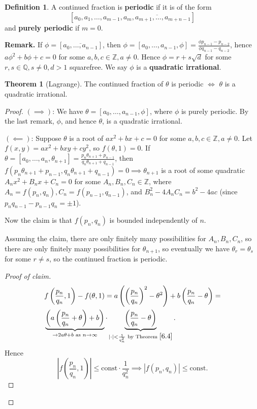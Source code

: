 \documentclass{article}
\theoremstyle{definition}
\newtheorem{theorem}{Theorem}[section]
\newtheorem{defn}{Definition}[section]
\begin{document}
\begin{defn}
    A continued fraction is \textbf{periodic} if it is of the form \[
    [a_0,a_1,\ldots,a_{m-1},\overline{a_m,a_{m+1},\ldots,a_{m+n-1}}]
    \]
    and \textbf{purely periodic} if $m=0$.
\end{defn}
\textbf{Remark.} If $\phi=[\overline{a_0,\ldots,a_{n-1}}]$, then $\phi=[a_0,\ldots,a_{n-1},\phi] = \frac{\phi p_{n-1}-p_{n-2}}{\phi q_{n-1}-q_{n-2}}$, hence $a \phi^2 + b \phi + c = 0$ for some $a,b,c \in \mathbb{Z}, a\neq 0$. Hence $\phi = r + s \sqrt{d}$ for some $r,s \in \mathbb{Q}, s\neq 0, d>1$ squarefree. We say $\phi$ is a \textbf{quadratic irrational}.

\begin{theorem}[Lagrange]
    The continued fraction of $\theta$ is periodic $\iff$ $\theta$ is a quadratic irrational.
\end{theorem}
\begin{proof}
    $(\implies )$: We have $\theta = [a_0,\ldots,a_{n-1},\phi]$, where $\phi$ is purely periodic. By the last remark, $\phi$, and hence $\theta$, is a quadratic irrational.
    \vspace{1mm}
    
    $(\impliedby)$: Suppose $\theta$ is a root of $ax^2+bx+c=0$ for some $a,b,c \in \mathbb{Z}, a\neq0$. Let $f(x,y)=ax^2+bxy+cy^2$, so $f(\theta,1)=0$. If $\theta = [a_0,\ldots,a_n,\theta_{n+1}] = \frac{p_n \theta_{n+1} + p_{n-1}}{q_n \theta_{n+1} + q_{n-1}}$, then $f(p_n \theta_{n+1} + p_{n-1}, q_n \theta_{n+1} + q_{n-1})= 0 \implies \theta_{n+1}$ is a root of some quadratic $A_n x^2 + B_n x + C_n=0$ for some $A_n,B_n,C_n \in \mathbb{Z}$, where $A_n = f(p_n,q_n), C_n = f(p_{n-1}, q_{n-1})$, and $B_n^2-4A_nC_n = b^2-4ac$ (since $p_nq_{n-1}-p_{n-1}q_n=\pm 1$).
    \vspace{1mm}
    
    Now the claim is that $f(p_n,q_n)$ is bounded independently of $n$.
    
    Assuming the claim, there are only finitely many possibilities for $A_n,B_n,C_n$, so there are only finitely many possibilities for $\theta_{n+1}$, so eventually we have $\theta_r=\theta_s$ for some $r \neq s$, so the continued fraction is periodic.
    \begin{proof}[Proof of claim]
        \begin{align*}
            &f\left(\frac{p_n}{q_n},1\right) - f(\theta,1) = a\left(\left(\frac{p_n}{q_n}\right)^2 - \theta^2\right) + b\left(\frac{p_n}{q_n}-\theta\right) = \\
            &\underbrace{\left(a \left(\frac{p_n}{q_n}+\theta\right) + b\right)}_{\to 2 a \theta + b \text{ as }n \to \infty } \cdot  \underbrace{\left(\frac{p_n}{q_n}- \theta\right)}_{|\cdot|<\frac{1}{q_n^2} \text{ by Theorem }\ref{6.4}}.
        \end{align*}
        Hence \[
        \left|f \left(\frac{p_n}{q_n},1\right)\right|\le \text{const} \cdot \frac{1}{q_n^2} \implies |f(p_n,q_n)|\le \text{const}.
        \]
    \end{proof}
\end{proof}
\end{document}
